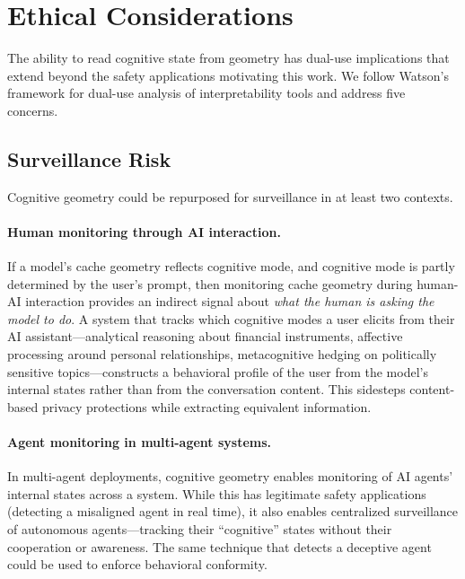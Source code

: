 
\section{Ethical Considerations}
\label{sec:ethics}

The ability to read cognitive state from \kvcache geometry has dual-use implications that extend beyond the safety applications motivating this work.
We follow Watson's framework for dual-use analysis of interpretability tools \cite{watson_dualuse} and address five concerns.

\subsection{Surveillance Risk}

Cognitive geometry could be repurposed for surveillance in at least two contexts.

\paragraph{Human monitoring through AI interaction.}
If a model's cache geometry reflects cognitive mode, and cognitive mode is partly determined by the user's prompt, then monitoring cache geometry during human-AI interaction provides an indirect signal about \emph{what the human is asking the model to do}.
A system that tracks which cognitive modes a user elicits from their AI assistant---analytical reasoning about financial instruments, affective processing around personal relationships, metacognitive hedging on politically sensitive topics---constructs a behavioral profile of the user from the model's internal states rather than from the conversation content.
This sidesteps content-based privacy protections while extracting equivalent information.

\paragraph{Agent monitoring in multi-agent systems.}
In multi-agent deployments, cognitive geometry enables monitoring of AI agents' internal states across a system.
While this has legitimate safety applications (detecting a misaligned agent in real time), it also enables centralized surveillance of autonomous agents---tracking their ``cognitive'' states without their cooperation or awareness.
The same technique that detects a deceptive agent could be used to enforce behavioral conformity.

